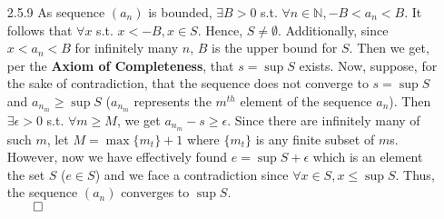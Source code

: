 \documentclass[11pt]{article}
\newcommand{\nats}{\mathbb{N}}
\begin{document}
\begin{itemize}
    \item[2.5.9]
        As sequence $(a_n)$ is bounded, $\exists B > 0$ s.t. $\forall n \in
        \nats, -B < a_n < B$. It follows that $\forall x$ s.t. $x < -B, x \in
        S$. Hence, $S \neq \emptyset$. Additionally, since $x < a_n < B$ for
        infinitely many $n$, $B$ is the upper bound for $S$. Then we get, per
        the \textbf{Axiom of Completeness}, that $s = \sup{S}$ exists. Now,
        suppose, for the sake of contradiction, that the sequence does not
        converge to $s = \sup{S}$ and $a_{n_m} \geq \sup{S}$ ($a_{n_m}$
        represents the $m^{th}$ element of the sequence $a_n$). Then $\exists
        \epsilon > 0$ s.t. $\forall m \geq M$, we get $a_{n_m} - s \geq
        \epsilon$. Since there are infinitely many of such $m$, let $M =
        \max{\{m_{t}\}} + 1$ where $\{m_{t}\}$ is any finite subset of $m$s.
        However, now we have effectively found $e = \sup{S} + \epsilon$ which
        is an element the set $S$ ($e \in S$) and we face a contradiction since
        $\forall x \in S, x \leq \sup{S}$. Thus, the sequence $(a_n)$ converges
        to $\sup{S}$.\\
        $\qed$
\end{itemize}

\end{document}
